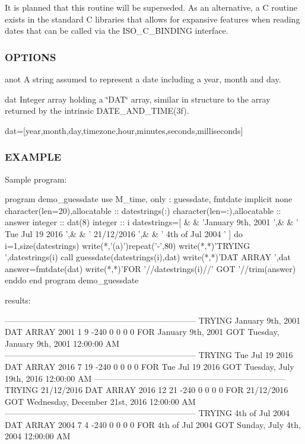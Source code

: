 \begin{DoxyVerb}
\begin{DoxyVerb}
It is planned that this routine will be superseded. As an alternative,
a C routine exists in the standard C libraries that allows for
expansive features when reading dates that can be called via the
ISO_C_BINDING interface.
\end{DoxyVerb}


\subsubsection*{O\+P\+T\+I\+O\+NS}

anot A string assumed to represent a date including a year, month and day.

dat Integer array holding a \char`\"{}\+D\+A\+T\char`\"{} array, similar in structure to the array returned by the intrinsic D\+A\+T\+E\+\_\+\+A\+N\+D\+\_\+\+T\+I\+M\+E(3f).

dat=\mbox{[}year,month,day,timezone,hour,minutes,seconds,milliseconds\mbox{]}

\subsubsection*{E\+X\+A\+M\+P\+LE}

\begin{DoxyVerb}Sample program:

 program demo_guessdate
 use M_time, only : guessdate, fmtdate
 implicit none
 character(len=20),allocatable :: datestrings(:)
 character(len=:),allocatable  :: answer
 integer                       :: dat(8)
 integer                       :: i
    datestrings=[ &
    & 'January 9th, 2001   ',&
    & ' Tue Jul 19 2016    ',&
    & ' 21/12/2016         ',&
    & ' 4th of Jul 2004    ' ]
    do i=1,size(datestrings)
       write(*,'(a)')repeat('-',80)
       write(*,*)'TRYING ',datestrings(i)
       call guessdate(datestrings(i),dat)
       write(*,*)'DAT ARRAY ',dat
       answer=fmtdate(dat)
       write(*,*)'FOR '//datestrings(i)//' GOT '//trim(answer)
    enddo
 end program demo_guessdate

results:

 ---------------------------------------------------------------------
 TRYING January 9th, 2001
 DAT ARRAY         2001  1  9   -240    0   0   0    0
 FOR January 9th, 2001    GOT Tuesday, January 9th, 2001 12:00:00 AM
 ---------------------------------------------------------------------
 TRYING  Tue Jul 19 2016
 DAT ARRAY         2016  7  19  -240    0   0   0    0
 FOR  Tue Jul 19 2016     GOT Tuesday, July 19th, 2016 12:00:00 AM
 ---------------------------------------------------------------------
 TRYING  21/12/2016
 DAT ARRAY         2016  12 21  -240    0   0   0    0
 FOR  21/12/2016          GOT Wednesday, December 21st, 2016 12:00:00 AM
 ---------------------------------------------------------------------
 TRYING  4th of Jul 2004
 DAT ARRAY         2004  7  4   -240    0   0   0    0
 FOR  4th of Jul 2004     GOT Sunday, July 4th, 2004 12:00:00 AM
\end{DoxyVerb}



\end{DoxyVerb}
